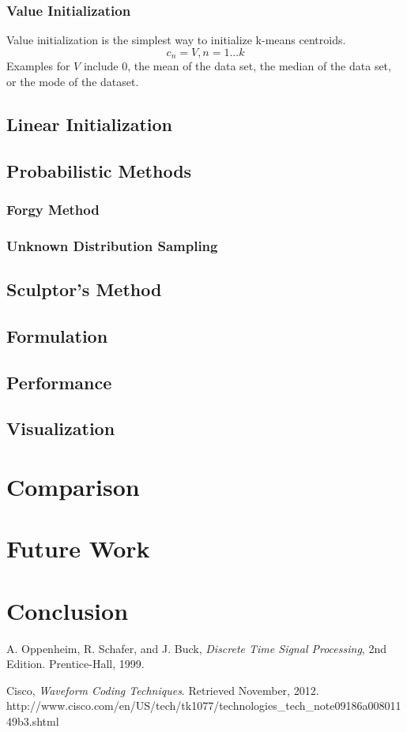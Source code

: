 \documentclass[journal]{IEEEtran}
\begin{document}
\subsubsection{Value Initialization}
Value initialization is the simplest way to initialize k-means centroids.
\begin{equation}
    c_n = V, n = 1...k
\end{equation}
Examples for $V$ include $0$, the mean of the data set, the median of the data set, or the mode of the dataset.

\subsection{Linear Initialization}
\subsection{Probabilistic Methods}
\subsubsection{Forgy Method}
\subsubsection{Unknown Distribution Sampling}
\subsection{Sculptor's Method}
\subsection{Formulation}
\subsection{Performance}
\subsection{Visualization}
\section{Comparison}
\section{Future Work}
\section{Conclusion}
\begin{thebibliography}{1}
A. Oppenheim, R. Schafer, and J. Buck, \emph{Discrete Time Signal Processing}, 2nd Edition. Prentice-Hall, 1999.

Cisco, \emph{Waveform Coding Techniques}. Retrieved November, 2012. http://www.cisco.com/en/US/tech/tk1077/technologies\_tech\_note09186a00801149b3.shtml 

\end{thebibliography}
\end{document}
